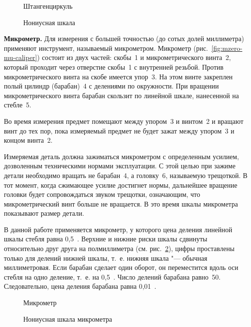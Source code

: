 \documentclass[a4paper, 12pt]{extarticle}
\begin{document}
\begin{figure}[h] %
\centering 
\begin{minipage}[t]{\textwidth}
 \begin{minipage}[t]{0.4\textwidth}
  \caption{Штангенциркуль \label{fig:mzero-caliper}}
 \end{minipage}
 \begin{minipage}[t]{0.4\textwidth}
  \caption{Нониусная шкала \label{fig:mzero-vernier-scale}}
 \end{minipage}
\end{minipage}
\end{figure}

\textbf{Микрометр. \quad}
Для измерения с большей точностью (до сотых долей миллиметра) применяют инструмент, называемый микрометром. Микрометр (рис.~\ref{fig:mzero-mu-caliper}) состоит из двух частей: скобы~1 и микрометрического винта~2, который проходит через отверстие скобы~1 с внутренней резьбой. Против микрометрического винта на скобе имеется упор~3. На этом винте закреплен полый цилиндр (барабан)~4 с делениями по окружности. При вращении микрометрического винта барабан скользит по линейной шкале, нанесенной на стебле~5.

Во время измерения предмет помещают между упором~3 и винтом~2 и вращают винт до тех пор, пока измеряемый предмет не будет зажат между упором~3 и концом винта~2.

Измеряемая деталь должна зажиматься микрометром с определенным усилием, дозволенным техническими нормами эксплуатации. С этой целью при зажиме детали необходимо вращать не барабан~4, а головку~6, называемую трещоткой. В тот момент, когда сжимающее усилие достигнет  нормы, дальнейшее вращение головки будет сопровождаться звуком трещотки,  означающим, что микрометрический винт больше не вращается. В это время шкалы микрометра показывают размер детали.

В данной работе применяется микрометр, у которого цена деления линейной шкалы стебля равна 0,5~. Верхние и нижние риски шкалы сдвинуты относительно друг друга на полмиллиметра (см. рис.~\ref{fig:mzero-mu-caliper-vernier}), цифры проставлены только для делений нижней шкалы, т.~е. нижняя шкала "--- обычная миллиметровая. Если барабан сделает один оборот, он переместится вдоль оси стебля на одно деление, т.~е. на 0,5~. Число делений барабана равно~50. Следовательно, цена деления барабана равна 0,01~.

\begin{figure}[h]
\centering
\begin{minipage}[t]{\textwidth}
 \begin{minipage}[t]{0.4\textwidth}
  \caption{Микрометр \label{fig:mzero-mu-caliper}}
 \end{minipage}
 \begin{minipage}[t]{0.4\textwidth}
  \caption{Нониусная шкала микрометра \label{fig:mzero-mu-caliper-vernier}}
 \end{minipage}
\end{minipage}
\end{figure}
\end{document}
